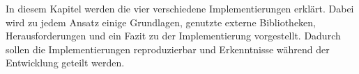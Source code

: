 In diesem Kapitel werden die vier verschiedene Implementierungen erklärt. Dabei wird zu jedem Ansatz einige Grundlagen, genutzte externe Bibliotheken, Herausforderungen und ein Fazit zu der Implementierung vorgestellt. Dadurch sollen die Implementierungen reproduzierbar und Erkenntnisse während der Entwicklung geteilt werden.






